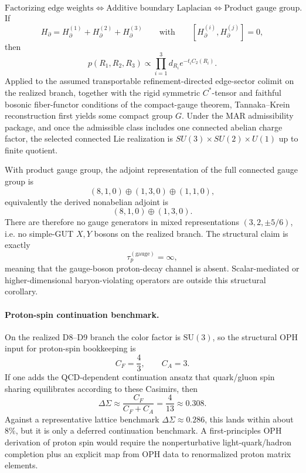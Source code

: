 \begin{theorem}
\[
\text{Factorizing edge weights}
\Longleftrightarrow
\text{Additive boundary Laplacian}
\Longleftrightarrow
\text{Product gauge group}.
\]
If
\[
H_\partial=H_\partial^{(1)}+H_\partial^{(2)}+H_\partial^{(3)}
\qquad\text{with}\qquad
[H_\partial^{(i)},H_\partial^{(j)}]=0,
\]
then
\[
p(R_1,R_2,R_3)\propto\prod_{i=1}^3 d_{R_i}e^{-t_iC_2(R_i)}.
\]
Applied to the assumed transportable refinement-directed edge-sector colimit on the realized
branch, together with the rigid symmetric
\(C^*\)-tensor and faithful bosonic fiber-functor conditions of the compact-gauge theorem,
Tannaka--Krein reconstruction first yields some compact group \(G\). Under the MAR admissibility
package, and once the admissible class includes one connected abelian charge factor, the selected
connected Lie realization is \(SU(3)\times SU(2)\times U(1)\) up to finite quotient.
\end{theorem}

\begin{corollary}
With product gauge group, the adjoint representation of the full connected gauge group is
\[
(8,1,0)\oplus(1,3,0)\oplus(1,1,0),
\]
equivalently the derived nonabelian adjoint is
\[
(8,1,0)\oplus(1,3,0).
\]
There are therefore no gauge generators in mixed representations \((3,2,\pm 5/6)\), i.e. no
simple-GUT \(X,Y\) bosons on the realized branch. The structural claim is exactly
\[
\tau_p^{(\mathrm{gauge})}=\infty,
\]
meaning that the gauge-boson proton-decay channel is absent. Scalar-mediated or
higher-dimensional baryon-violating operators are outside this structural corollary.
\end{corollary}

\paragraph{Proton-spin continuation benchmark.}
On the realized D8--D9 branch the color factor is \(\mathrm{SU}(3)\), so the structural OPH
input for proton-spin bookkeeping is
\[
C_F=\frac43,
\qquad
C_A=3.
\]
If one adds the QCD-dependent continuation ansatz that quark/gluon spin sharing equilibrates
according to these Casimirs, then
\[
\Delta\Sigma\approx \frac{C_F}{C_F+C_A}=\frac{4}{13}\approx 0.308.
\]
Against a representative lattice benchmark \(\Delta\Sigma\approx 0.286\), this lands within about
\(8\%\), but it is only a deferred continuation benchmark. A first-principles OPH derivation of
proton spin would require the nonperturbative light-quark/hadron completion plus an explicit map
from OPH data to renormalized proton matrix elements.


